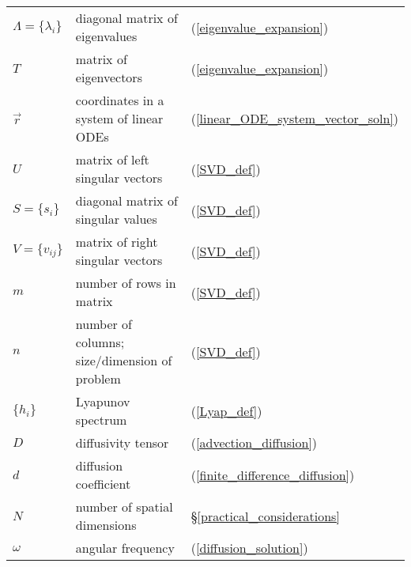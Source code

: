 \begin{tabular}{lll}
	$\Lambda = \lbrace \lambda_i \rbrace$ & diagonal matrix of eigenvalues & (\ref{eigenvalue_expansion}) \\
	$T$ & matrix of eigenvectors & (\ref{eigenvalue_expansion}) \\
	$\vec r$ & coordinates in a system of linear ODEs & (\ref{linear_ODE_system_vector_soln}) \\
	$U$ & matrix of left singular vectors & (\ref{SVD_def}) \\
	$S=\lbrace s_i \rbrace$ & diagonal matrix of singular values & (\ref{SVD_def}) \\
	$V=\lbrace v_{ij} \rbrace$ & matrix of right singular vectors & (\ref{SVD_def}) \\
	$m$ & number of rows in matrix & (\ref{SVD_def}) \\
	$n$ & number of columns; size/dimension of problem & (\ref{SVD_def}) \\
	$\lbrace h_i \rbrace$ & Lyapunov spectrum & (\ref{Lyap_def}) \\
	$D$ & diffusivity tensor & (\ref{advection_diffusion}) \\
	$d$ & diffusion coefficient & (\ref{finite_difference_diffusion}) \\
	$N$ & number of spatial dimensions & \S \ref{practical_considerations} \\
	$\omega$ & angular frequency & (\ref{diffusion_solution})
\end{tabular}

